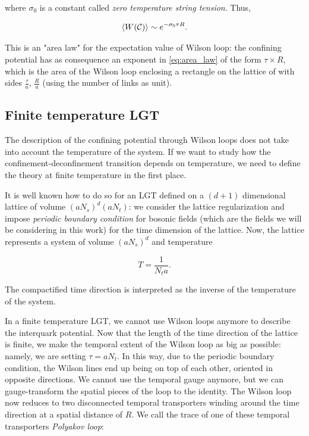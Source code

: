 \documentclass[reqno,12pt]{article}
\numberwithin{equation}{section}
\begin{document}
where $\sigma_0$ is a constant called \textit{zero temperature string tension}. Thus,

\begin{equation} \label{eq:area_law}
	\expval{W(\mathcal{C})} \sim e^{-\sigma_0 \tau R}.
\end{equation}

This is an "area law" for the expectation value of Wilson loop: the confining potential has as consequence
an exponent in \eqref{eq:area_law} of the form $\tau \times R$, which is the area of the Wilson loop enclosing
a rectangle on the lattice of with sides $\frac{\tau}{a}$, $\frac{R}{a}$ (using the number of links as unit). 

\subsection{Finite temperature LGT} \label{finitetemperature}

The description of the confining potential through Wilson loops does not take into account the temperature of the system.
If we want to study how the confinement-deconfinement transition depends on temperature, we need to define the theory at finite
temperature in the first place. 

It is well known how to do so for an LGT defined on a $(d+1)$ dimensional lattice of volume $(aN_s)^d(aN_t)$:
we consider the lattice regularization and impose \textit{periodic boundary condition} 
for bosonic fields (which are the fields we will be considering in this work) for the time dimension of the lattice. 
Now, the lattice represents a system of volume $(aN_s)^d$ and temperature

\begin{equation} \label{eq:lattice_temperature}
	T = \frac{1}{N_t a}.
\end{equation}

The compactified time direction is interpreted as the inverse of the temperature of the system.

In a finite temperature LGT, we cannot use Wilson loops anymore to describe the interquark potential. Now that the 
length of the time direction of the lattice is finite, we make the temporal extent of the Wilson loop as big as possible:
namely, we are setting $\tau = aN_t$. In this way, due to the periodic boundary condition,
the Wilson lines end up being on top of each other, oriented in opposite directions. We cannot use the temporal gauge
anymore, but we can gauge-transform the spatial pieces of the loop to the identity. The Wilson loop now reduces to two 
disconnected temporal transporters winding around the time direction at a spatial distance of $R$. We call the trace of one
of these temporal transporters \textit{Polyakov loop}:
\end{document}
